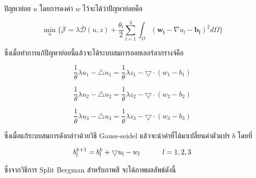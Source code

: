 \documentclass[hidelinks,a4paper,14pt]{article}
\numberwithin{equation}{section}							%
\begin{document}
{			
			ปัญหาย่อย $u$ โดยการคงค่า $w$ ไว้จะได้ว่าปัญหาย่อยคือ
			
				$$ 
			\min_{u} \{\bar{\mathcal{J}}= \lambda \mathcal{\bar{D}}(u,z) + \frac{\theta_l}{2} \underset{l=1}{\overset{3}{\sum}}\int_{\Omega}^{}(\boldsymbol{w_l} - \nabla u_l - \boldsymbol{b_l})^{2}d\Omega\}
			$$
			
			ซึ่งเมื่อทำการแก้ปัญหาย่อยนี้แล้วจะได้ระบบสมการออยเลอร์ลากรางจ์คือ
			
			$$ \frac{1}{\theta}\lambda u_1 - \bigtriangleup u_1 = \frac{1}{\theta} \lambda z_1 - \bigtriangledown \cdot (w_1-b_1) $$
			
			$$ \frac{1}{\theta}\lambda u_2 - \bigtriangleup u_2 = \frac{1}{\theta} \lambda z_2 - \bigtriangledown \cdot (w_2-b_2) $$
			
			$$ \frac{1}{\theta}\lambda u_3 - \bigtriangleup u_3 = \frac{1}{\theta} \lambda z_3 - \bigtriangledown \cdot (w_3-b_3) $$
			
			ซึ่งเมื่อแก้ระบบสมการดังกล่าวด้วยวิธี Gauss-seidel แล้วจะนำค่าที่ได้มาเปลี่ยนค่าตัวแปร $b$ โดยที่
			
			$$ b_{l}^{k+1} = b_{l}^k  + \bigtriangledown u_{l} - w_{l} \hspace{1cm}  \hspace{0.1cm} l = 1,2,3 $$
			
			ซึ่งจากวิธีการ Split Bergman สำหรับภาพสี จะได้ภาพผลลัพธ์ดังนี้
			
}
\end{document}
